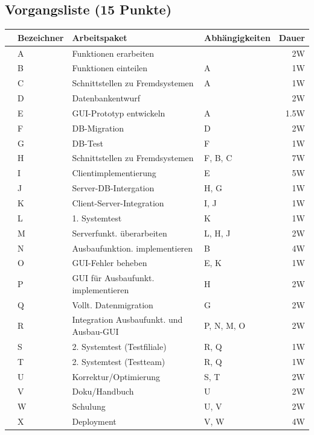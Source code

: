 \documentclass{scrartcl}
\begin{document}
\subsection{Vorgangsliste (15 Punkte)}
\begin{center}
   \renewcommand{\arraystretch}{1.5}
   \begin{tabular}{l:lllr}
      \toprule
      &Bezeichner & Arbeitspaket & Abhängigkeiten & Dauer\\
      \midrule
      &A & Funktionen erarbeiten & & 2W\\
      &B & Funktionen einteilen & A & 1W\\
      &C & Schnittstellen zu Fremdsystemen & A & 1W\\
      &D & Datenbankentwurf & & 2W \\
      &E & GUI-Prototyp entwickeln & A & 1.5W\\
      \midrule
      &F & DB-Migration & D & 2W \\
      &G & DB-Test & F& 1W \\
      &H & Schnittstellen zu Fremdsystemen & F, B, C & 7W \\
      &I & Clientimplementierung & E & 5W \\
      &J & Server-DB-Intergation & H, G& 1W \\
      &K & Client-Server-Integration & I, J & 1W \\
      &L & 1. Systemtest & K & 1W \\
      \midrule
      &M & Serverfunkt. überarbeiten & L, H, J& 2W \\
      &N & Ausbaufunktion.  implementieren & B & 4W\\
      &O & GUI-Fehler beheben & E, K & 1W \\
      &P & GUI für Ausbaufunkt. implementieren & H & 2W \\
      &Q & Vollt. Datenmigration & G & 2W \\
      &R & Integration Ausbaufunkt.  und Ausbau-GUI & P, N, M, O & 2W \\
      &S & 2. Systemtest (Testfiliale) & R, Q & 1W \\
      &T & 2. Systemtest (Testteam) & R, Q & 1W \\
      \midrule
      &U & Korrektur/Optimierung & S, T & 2W \\
      &V & Doku/Handbuch & U & 2W \\
      &W & Schulung & U, V & 2W \\
      &X & Deployment &  V, W & 4W\\
      \bottomrule
   \end{tabular}
\end{center}
\end{document}
